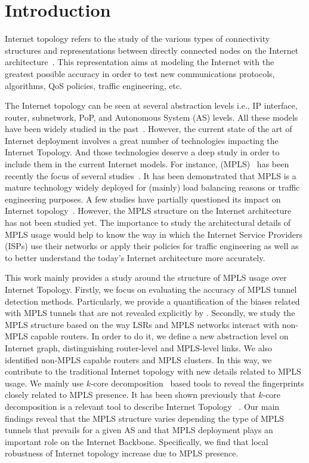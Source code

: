 \section{Introduction}\label{intro}
Internet topology refers to the study of the various types of connectivity
structures and representations between directly connected nodes on the Internet
architecture~\cite{Calvert97}. This representation aims at modeling the Internet
with the greatest possible accuracy in order to test new communications
protocols, algorithms, QoS policies, traffic engineering, etc.

The Internet topology can be seen at several abstraction levels i.e., IP
interface, router, subnetwork, PoP, and Autonomous System (AS) levels. All these
models have been widely studied in the past~\cite{DONNET13}. However, the
current state of the art of Internet deployment involves a great number of
technologies impacting the  Internet Topology.  And those technologies deserve a
deep study in order to include them in the current Internet models.  For
instance,  (MPLS)~\cite{rfc3031} has been
recently the focus of several studies~\cite{SOM11,Donnet12,Vanaubel15}.  It has
been demonstrated that MPLS is a mature technology widely deployed for (mainly)
load balancing reasons or traffic engineering purposes.  A few studies have
partially questioned its impact on Internet topology~\cite{BRICE07,Flach2012}.
However, the MPLS structure on the Internet architecture has not been studied
yet.  The importance to study  the architectural details of MPLS usage would
help to know the way in which the Internet Service Providers (ISPs) use their
networks or apply their policies for traffic engineering as well as to better
understand the today's Internet architecture more accurately.

This work mainly provides a study around the structure of MPLS usage over
Internet Topology. Firstly, we focus on evaluating the accuracy of MPLS tunnel
detection methods. Particularly, we provide a quantification of the biases
related with MPLS tunnels that are not revealed explicitly by \traceroute.
Secondly, we study the MPLS structure based on the way LSRs and MPLS networks
interact with non-MPLS capable routers. In order to do it, we define a new
abstraction level on Internet graph, distinguishing  router-level and MPLS-level
links. We also identified non-MPLS capable routers and  MPLS clusters. In this
way, we contribute to the traditional Internet topology with new details related
to MPLS usage. We mainly use $k$-core decomposition~\cite{batagelj2002} based
tools to reveal the fingerprints closely related to MPLS presence. It has been
shown previously that $k$-core decomposition is a relevant tool to describe
Internet Topology ~\cite{Alvarez06k, Serrano06, Alvarez08k}. Our main findings
reveal that the MPLS structure varies depending the type of MPLS tunnels that
prevails for a given AS and that MPLS deployment plays an important role on the
Internet Backbone. Specifically, we find that local robustness of Internet
topology increase due to MPLS presence.

